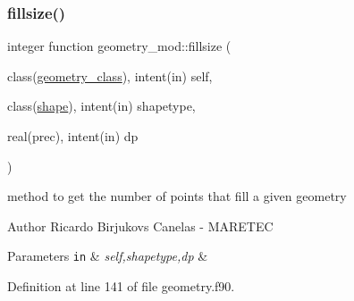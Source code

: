 \subsubsection{\texorpdfstring{fillsize()}{fillsize()}}
{\footnotesize\ttfamily integer function geometry\+\_\+mod\+::fillsize (\begin{DoxyParamCaption}\item[{class(\mbox{\hyperlink{structgeometry__mod_1_1geometry__class}{geometry\+\_\+class}}), intent(in)}]{self,  }\item[{class(\mbox{\hyperlink{structgeometry__mod_1_1shape}{shape}}), intent(in)}]{shapetype,  }\item[{real(prec), intent(in)}]{dp }\end{DoxyParamCaption})\hspace{0.3cm}{\ttfamily [private]}}



method to get the number of points that fill a given geometry 

\begin{DoxyAuthor}{Author}
Ricardo Birjukovs Canelas -\/ M\+A\+R\+E\+T\+EC 
\end{DoxyAuthor}

\begin{DoxyParams}[1]{Parameters}
\mbox{\tt in}  & {\em self,shapetype,dp} & \\
\hline
\end{DoxyParams}


Definition at line 141 of file geometry.\+f90.


